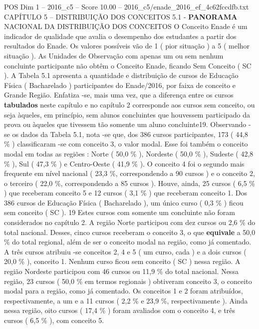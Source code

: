 \begin{textsample}{POS Dim 1 – 2016\_c5 – Score 10.00 – 2016\_c5/enade\_2016\_ef\_4c62fccdfb.txt}  \label{ex:f1_pos_076}
CAPÍTULO 5 – DISTRIBUIÇÃO DOS CONCEITOS 5.1 - \textbf{PANORAMA} NACIONAL DA DISTRIBUIÇÃO DOS CONCEITOS O Conceito Enade é um indicador de qualidade que avalia o desempenho dos estudantes a partir dos resultados do Enade.
Os valores possíveis vão de 1 ( pior situação ) a 5 ( melhor situação ).
As Unidades de Observação com apenas um ou sem nenhum concluinte participante não obtêm o Conceito Enade, ficando Sem Conceito ( SC ).
A Tabela 5.1 apresenta a quantidade e distribuição de cursos de Educação Física ( Bacharelado ) participantes do Enade/2016, por faixa de conceito e Grande Região.
Enfatiza -se, mais uma vez, que a diferença entre os cursos \textbf{tabulados} neste capítulo e no capítulo 2 corresponde aos cursos sem conceito, ou seja àqueles, em princípio, sem alunos concluintes que houvessem participado da prova ou àqueles que tivessem tão somente um aluno concluinte19.
Observando -se os dados da Tabela 5.1, nota -se que, dos 386 cursos participantes, 173 ( 44,8 \% ) classificaram -se com conceito 3, o valor modal.
Esse foi também o conceito modal em todas as regiões : Norte ( 50,0 \% ), Nordeste ( 50,0 \% ), Sudeste ( 42,8 \% ), Sul ( 47,3 \% ) e Centro-Oeste ( 41,9 \% ).
O conceito 4 foi o segundo mais frequente em nível nacional ( 23,3 \%, correspondendo a 90 cursos ) e o conceito 2, o terceiro ( 22,0 \%, correspondendo a 85 cursos ).
Houve, ainda, 25 cursos ( 6,5 \% ) que receberam conceito 5 e 12 cursos ( 3,1 \% ) que receberam conceito 1.
Dos 386 cursos de Educação Física ( Bacharelado ), um único curso ( 0,3 \% ) ficou sem conceito ( SC ). 19 Estes cursos com somente um concluinte não foram considerados no capítulo 2.
A região Norte participou com dez cursos ou 2,6 \% do total nacional.
Desses, cinco cursos receberam o conceito 3, o que \textbf{equivale} a 50,0 \% do total regional, além de ser o conceito modal na região, como já comentado.
A três cursos atribuiu -se conceitos 2, 4 e 5 ( um curso, cada ) e a dois cursos ( 20,0 \% ), conceito 1.
Nenhum curso ficou sem conceito ( SC ) nessa região.
A região Nordeste participou com 46 cursos ou 11,9 \% do total nacional.
Nessa região, 23 cursos ( 50,0 \% em termos regionais ) obtiveram conceito 3, o conceito modal para a região, como já comentado.
Os conceitos 1 e 2 foram atribuídos, respectivamente, a um e a 11 cursos ( 2,2 \% e 23,9 \%, respectivamente ).
Ainda nessa região, oito cursos ( 17,4 \% ) foram avaliados com o conceito 4, e três cursos ( 6,5 \% ), com conceito 5.

\end{textsample}
